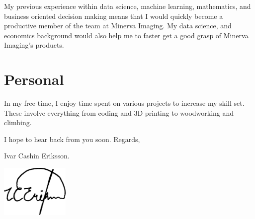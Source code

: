 \documentclass[10pt,a4paper,sans]{moderncv}
\newcommand{\company}{Minerva Imaging}
\begin{document}


\hspace{7 mm} My previous experience within data science, machine learning, mathematics, and business oriented decision making means that I would quickly become a productive member of the team at \company{}. My data science, and economics background would also help me to faster get a good grasp of \company{}'s products.

\section{Personal}
In my free time, I enjoy time spent on various projects to increase my skill set. These involve everything from coding and 3D printing to woodworking and climbing.


\vspace{3 mm}
I hope to hear back from you soon. Regards,

\vspace{3 mm}
Ivar Cashin Eriksson.

\vspace{-14mm}
\hfill \includegraphics[height=2.5cm]{../assets/Signature_Vectorised.pdf}
\end{document}
